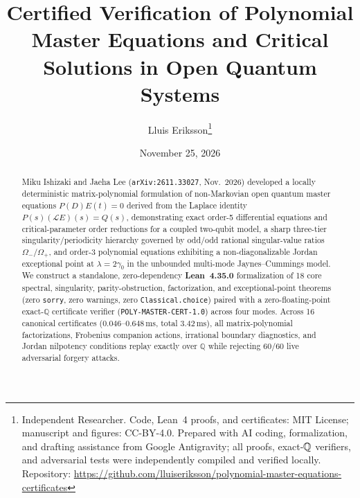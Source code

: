 \documentclass[10pt,twocolumn]{article}
\title{\vspace{-1.1em}\textbf{Certified Verification of Polynomial Master Equations and Critical Solutions in Open Quantum Systems}}
\author{Lluis Eriksson\thanks{Independent Researcher. Code, Lean~4 proofs, and certificates: MIT License; manuscript and figures: CC-BY-4.0. Prepared with AI coding, formalization, and drafting assistance from Google Antigravity; all proofs, exact-$\QQ$ verifiers, and adversarial tests were independently compiled and verified locally. Repository: \url{https://github.com/lluiseriksson/polynomial-master-equations-certificates}}}
\date{November 25, 2026}
\newcommand{\QQ}{\mathbb{Q}}
\begin{document}
\maketitle
\vspace{-1.4em}

\begin{abstract}
Miku Ishizaki and Jaeha Lee (\texttt{arXiv:2611.33027}, Nov.\ 2026) developed a locally deterministic matrix-polynomial formulation of non-Markovian open quantum master equations $P(D)E(t) = 0$ derived from the Laplace identity $P(s)(\mathcal{L}E)(s) = Q(s)$, demonstrating exact order-5 differential equations and critical-parameter order reductions for a coupled two-qubit model, a sharp three-tier singularity/periodicity hierarchy governed by odd/odd rational singular-value ratios $\Omega_-/\Omega_+$, and order-3 polynomial equations exhibiting a non-diagonalizable Jordan exceptional point at $\lambda = 2\gamma_0$ in the unbounded multi-mode Jaynes--Cummings model. We construct a standalone, zero-dependency \textbf{Lean~4.35.0} formalization of 18 core spectral, singularity, parity-obstruction, factorization, and exceptional-point theorems (zero \texttt{sorry}, zero warnings, zero \texttt{Classical.choice}) paired with a zero-floating-point exact-$\QQ$ certificate verifier (\texttt{POLY-MASTER-CERT-1.0}) across four modes. Across 16 canonical certificates ($0.046$--$0.648\,\mathrm{ms}$, total $3.42\,\mathrm{ms}$), all matrix-polynomial factorizations, Frobenius companion actions, irrational boundary diagnostics, and Jordan nilpotency conditions replay exactly over $\QQ$ while rejecting 60/60 live adversarial forgery attacks.
\end{abstract}
\end{document}
